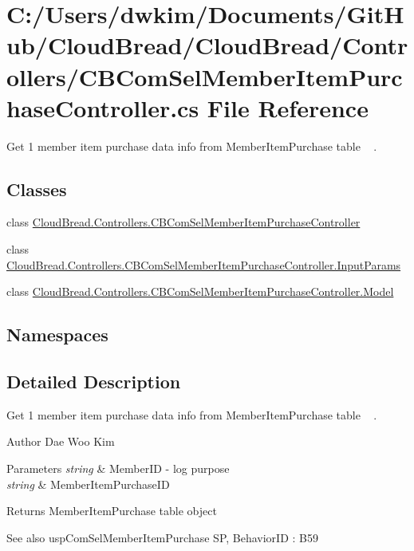 \hypertarget{a00206}{}\section{C\+:/\+Users/dwkim/\+Documents/\+Git\+Hub/\+Cloud\+Bread/\+Cloud\+Bread/\+Controllers/\+C\+B\+Com\+Sel\+Member\+Item\+Purchase\+Controller.cs File Reference}
\label{a00206}


Get 1 member item purchase data info from Member\+Item\+Purchase table ~\newline
.  


\subsection*{Classes}
\begin{DoxyCompactItemize}
\item 
class \hyperlink{a00033}{Cloud\+Bread.\+Controllers.\+C\+B\+Com\+Sel\+Member\+Item\+Purchase\+Controller}
\item 
class \hyperlink{a00123}{Cloud\+Bread.\+Controllers.\+C\+B\+Com\+Sel\+Member\+Item\+Purchase\+Controller.\+Input\+Params}
\item 
class \hyperlink{a00153}{Cloud\+Bread.\+Controllers.\+C\+B\+Com\+Sel\+Member\+Item\+Purchase\+Controller.\+Model}
\end{DoxyCompactItemize}
\subsection*{Namespaces}
\begin{DoxyCompactItemize}
\end{DoxyCompactItemize}


\subsection{Detailed Description}
Get 1 member item purchase data info from Member\+Item\+Purchase table ~\newline
. 

\begin{DoxyAuthor}{Author}
Dae Woo Kim 
\end{DoxyAuthor}

\begin{DoxyParams}{Parameters}
{\em string} & Member\+ID -\/ log purpose \\
\hline
{\em string} & Member\+Item\+Purchase\+ID \\
\hline
\end{DoxyParams}
\begin{DoxyReturn}{Returns}
Member\+Item\+Purchase table object 
\end{DoxyReturn}
\begin{DoxySeeAlso}{See also}
usp\+Com\+Sel\+Member\+Item\+Purchase SP, Behavior\+ID \+: B59 
\end{DoxySeeAlso}
